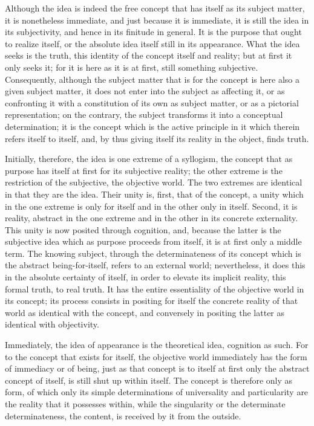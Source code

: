 Although the idea is indeed the free concept that has itself as its subject
matter, it is nonetheless immediate, and just because it is immediate, it is
still the idea in its subjectivity, and hence in its finitude in general. It is
the purpose that ought to realize itself, or the absolute idea itself still in its
appearance. What the idea seeks is the truth, this identity of the concept
itself and reality; but at first it only seeks it; for it is here as it is at first, still
something subjective. Consequently, although the subject matter that is for
the concept is here also a given subject matter, it does not enter into the
subject as affecting it, or as confronting it with a constitution of its own as
subject matter, or as a pictorial representation; on the contrary, the subject
transforms it into a conceptual determination; it is the concept which is the
active principle in it
 which therein refers itself to itself, and, by thus
giving itself its reality in the object, finds truth.

Initially, therefore, the idea is one extreme of a syllogism, the concept
that as purpose has itself at first for its subjective reality; the other extreme is
the restriction of the subjective, the objective world. The two extremes are
identical in that they are the idea. Their unity is, first, that of the concept,
a unity which in the one extreme is only for itself and in the other only in
itself. Second, it is reality, abstract in the one extreme and in the other in
its concrete externality.
 This unity is now posited through cognition, and,
because the latter is the subjective idea which as purpose proceeds from
itself, it is at first only a middle term.
 The knowing subject, through the
determinateness of its concept which is the abstract being-for-itself, refers
to an external world; nevertheless, it does this in the absolute certainty
of itself, in order to elevate its implicit reality, this formal truth, to real
truth. It has the entire essentiality of the objective world in its concept; its
process consists in positing for itself the concrete reality of that world as
identical with the concept, and conversely in positing the latter as identical
with objectivity.

Immediately, the idea of appearance is
the theoretical idea, cognition as such.
For to the concept that exists for itself,
the objective world immediately has
the form of immediacy or of being,
just as that concept is to itself
at first only the abstract concept of itself,
is still shut up within itself.
The concept is therefore only as form,
of which only its simple determinations
of universality and particularity are
the reality that it possesses within,
while the singularity or the determinate determinateness,
the content, is received by it from the outside.

